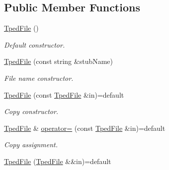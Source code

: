 \subsection*{Public Member Functions}
\begin{DoxyCompactItemize}
\item 
\mbox{\label{classvarfiles_1_1_tped_file_ac37863ce046f137b2944b8ddcb0f5afa}} 
\hyperlink{classvarfiles_1_1_tped_file_ac37863ce046f137b2944b8ddcb0f5afa}{Tped\+File} ()
\begin{DoxyCompactList}\small\item\em Default constructor. \end{DoxyCompactList}\item 
\hyperlink{classvarfiles_1_1_tped_file_af2850446a85d8a6024a04d8648fd4987}{Tped\+File} (const string \&stub\+Name)
\begin{DoxyCompactList}\small\item\em File name constructor. \end{DoxyCompactList}\item 
\mbox{\label{classvarfiles_1_1_tped_file_a37125cebec64cb044431fcb309473e71}} 
\hyperlink{classvarfiles_1_1_tped_file_a37125cebec64cb044431fcb309473e71}{Tped\+File} (const \hyperlink{classvarfiles_1_1_tped_file}{Tped\+File} \&in)=default
\begin{DoxyCompactList}\small\item\em Copy constructor. \end{DoxyCompactList}\item 
\mbox{\label{classvarfiles_1_1_tped_file_ad5277ba64ad063f9eabee182da83a492}} 
\hyperlink{classvarfiles_1_1_tped_file}{Tped\+File} \& \hyperlink{classvarfiles_1_1_tped_file_ad5277ba64ad063f9eabee182da83a492}{operator=} (const \hyperlink{classvarfiles_1_1_tped_file}{Tped\+File} \&in)=default
\begin{DoxyCompactList}\small\item\em Copy assignment. \end{DoxyCompactList}\item 
\mbox{\label{classvarfiles_1_1_tped_file_a7181b4ecfbed4d8a2c0b81d22609033a}} 
\hyperlink{classvarfiles_1_1_tped_file_a7181b4ecfbed4d8a2c0b81d22609033a}{Tped\+File} (\hyperlink{classvarfiles_1_1_tped_file}{Tped\+File} \&\&in)=default

\end{DoxyCompactItemize}
